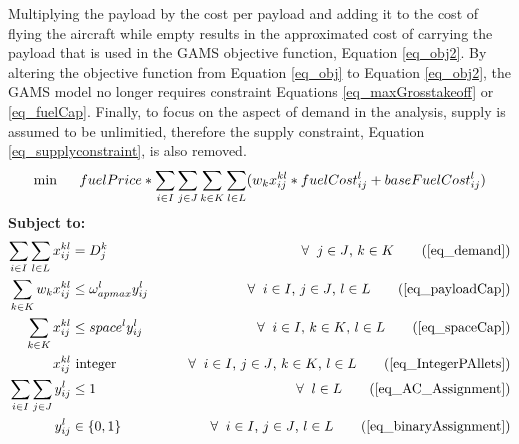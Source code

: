 Multiplying the payload by the cost per payload and adding it to the cost of flying the aircraft while empty results in the approximated cost of carrying the payload that is used in the GAMS objective function, Equation \ref{eq_obj2}. By altering the objective function from Equation \ref{eq_obj} to Equation \ref{eq_obj2}, the GAMS model no longer requires constraint Equations \ref{eq_maxGrosstakeoff} or \ref{eq_fuelCap}. Finally, to focus on the aspect of demand in the analysis, supply is assumed to be unlimitied, therefore the supply constraint, Equation \ref{eq_supplyconstraint}, is also removed.
\begin{equation}
\label{eq_obj2}
\min \hspace{5mm}
fuelPrice*\sum_{i\in I}\sum_{j\in J}\sum_{k\in K}\sum_{l\in L}(w_{k}x_{ij}^{kl}*fuelCost_{ij}^{l}+baseFuelCost_{ij}^l)
\end{equation}
\textbf{Subject to:}
\begin{align*}
\sum_{i\in I}\sum_{l\in L}x_{ij}^{kl}&= D_j^{k} &\forall \hspace{2mm} j \in J \text{, } k\in K \tag{\ref{eq_demand}}\\
\sum_{k\in K}w_{k}x_{ij}^{kl}&\leq \omega_{apmax}^{l}y_{ij}^l &\forall \hspace{2mm} i \in I \text{, } j\in J \text{, } l \in L \tag{\ref{eq_payloadCap}}\\
\sum_{k\in K}x_{ij}^{kl} &\leq space^{l}y_{ij}^l  &\forall \hspace{2mm}  i\in I \text{, } k\in K \text{, } l\in L \tag{\ref{eq_spaceCap}}\\
x_{ij}^{kl}& \text{  integer}  \hspace{15mm}&\forall \hspace{2mm} i\in I \text{, } j \in J \text{, } k\in K \text{, } l \in L \tag{\ref{eq_IntegerPAllets}}\\ 
\sum_{i \in I}\sum_{j\in J}y_{ij}^l &\leq 1 &\forall \hspace{2mm} l \in L \tag{\ref{eq_AC_Assignment}}\\
y_{ij}^l &\in \{0,1\} &\forall \hspace{2mm} i \in I \text{, } j \in J \text{, } l\in L \tag{\ref{eq_binaryAssignment}}
\end{align*}

